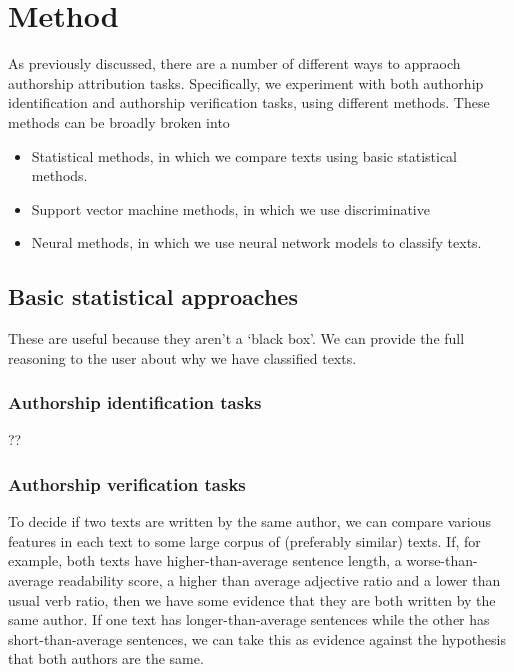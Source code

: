 \section{Method}\label{chap:meth}

As previously discussed, there are a number of different ways to
appraoch authorship attribution tasks. Specifically, we experiment with
both authorhip identification and authorship verification tasks, using
different methods. These methods can be broadly broken into

\begin{itemize}
\item
  Statistical methods, in which we compare texts using basic statistical
  methods.
\item
  Support vector machine methods, in which we use discriminative
\item
  Neural methods, in which we use neural network models to classify
  texts.
\end{itemize}

\subsection{Basic statistical
approaches}\label{basic-statistical-approaches}

These are useful because they aren't a `black box'. We can provide the
full reasoning to the user about why we have classified texts.

\subsubsection{Authorship identification
tasks}\label{authorship-identification-tasks}

??

\subsubsection{Authorship verification
tasks}\label{authorship-verification-tasks}

To decide if two texts are written by the same author, we can compare
various features in each text to some large corpus of (preferably
similar) texts. If, for example, both texts have higher-than-average
sentence length, a worse-than-average readability score, a higher than
average adjective ratio and a lower than usual verb ratio, then we have
some evidence that they are both written by the same author. If one text
has longer-than-average sentences while the other has short-than-average
sentences, we can take this as evidence against the hypothesis that both
authors are the same.

